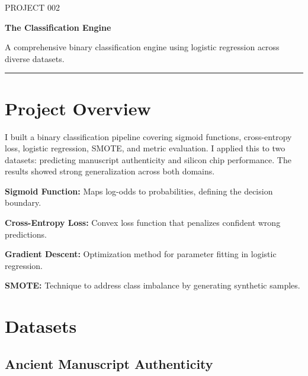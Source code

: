 \documentclass[11pt,a4paper]{article}
\begin{document}
\thispagestyle{empty}

{\colorbox{primary}{}}

\vspace{6pt}

{\fontsize{9}{11}\selectfont\color{codemuted}PROJECT 002}

\vspace{1pt}
{\fontsize{22}{27}\selectfont\bfseries\color{titleblue} The Classification Engine}

\vspace{2pt}
{\normalsize\color{accent} A comprehensive binary classification engine using logistic regression across diverse datasets.}

\vspace{4pt}
{\color{tableheader}\rule{\linewidth}{0.4pt}}

\vspace{3pt}

\section{Project Overview}

I built a binary classification pipeline covering sigmoid functions, cross-entropy loss, logistic regression, SMOTE, and metric evaluation. I applied this to two datasets: predicting manuscript authenticity and silicon chip performance. The results showed strong generalization across both domains.

\textbf{Sigmoid Function:} Maps log-odds to probabilities, defining the decision boundary.

\textbf{Cross-Entropy Loss:} Convex loss function that penalizes confident wrong predictions.

\textbf{Gradient Descent:} Optimization method for parameter fitting in logistic regression.

\textbf{SMOTE:} Technique to address class imbalance by generating synthetic samples.


\section{Datasets}

\subsection{Ancient Manuscript Authenticity}
\end{document}
